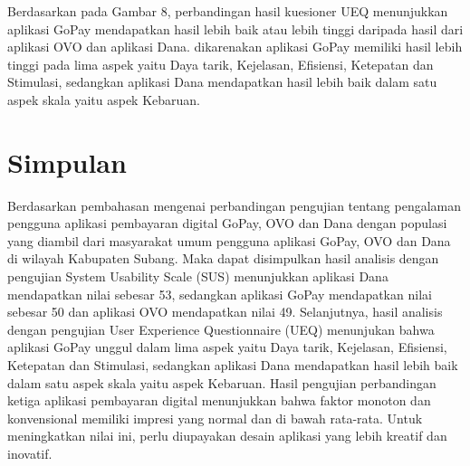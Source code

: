 \documentclass[
 manuscript=article,  %
  layout=publish, 
  year=2024, 
  month= Februari, %
  volume=8,
  number=1 
]{JIKO}
\begin{document}
Berdasarkan pada Gambar 8, perbandingan hasil kuesioner UEQ menunjukkan aplikasi GoPay mendapatkan hasil lebih baik atau lebih tinggi daripada hasil dari aplikasi OVO dan aplikasi Dana. dikarenakan aplikasi GoPay memiliki hasil lebih tinggi pada lima aspek yaitu Daya tarik, Kejelasan, Efisiensi, Ketepatan dan Stimulasi, sedangkan aplikasi Dana mendapatkan hasil lebih baik dalam satu aspek skala yaitu aspek Kebaruan.

\section{Simpulan}

Berdasarkan pembahasan mengenai perbandingan pengujian tentang pengalaman pengguna aplikasi pembayaran digital GoPay, OVO dan Dana dengan populasi yang diambil dari masyarakat umum pengguna aplikasi GoPay, OVO dan Dana di wilayah Kabupaten Subang. Maka dapat disimpulkan hasil analisis dengan pengujian System Usability Scale (SUS) menunjukkan aplikasi Dana mendapatkan nilai sebesar 53, sedangkan aplikasi GoPay mendapatkan nilai sebesar 50 dan aplikasi OVO mendapatkan nilai 49. Selanjutnya, hasil analisis dengan pengujian User Experience Questionnaire (UEQ) menunjukan bahwa aplikasi GoPay unggul dalam lima aspek yaitu Daya tarik, Kejelasan, Efisiensi, Ketepatan dan Stimulasi, sedangkan aplikasi Dana mendapatkan hasil lebih baik dalam satu aspek skala yaitu aspek Kebaruan. Hasil pengujian perbandingan ketiga aplikasi pembayaran digital menunjukkan bahwa faktor monoton dan konvensional memiliki impresi yang normal dan di bawah rata-rata. Untuk meningkatkan nilai ini, perlu diupayakan desain aplikasi yang lebih kreatif dan inovatif.



\renewcommand{\refname}{Pustaka} %
	




\cite{1}
\cite{2}
\cite{3}
\cite{4}
\cite{5}
\cite{6}
\cite{7}
\cite{8}
\cite{9}
\cite{10}
\cite{11}
\cite{12}
\cite{13}
\cite{14}
\cite{15}
\cite{16}
\cite{17}
\cite{18}

\end{document}
